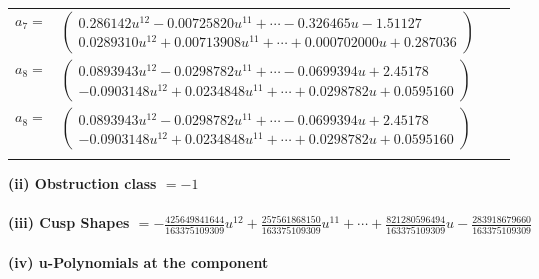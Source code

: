 \documentclass[1p]{elsarticle_modified}
\theoremstyle{definition}
\begin{document}
\begin{tabular}{m{7pt} m{180pt} m{7pt} m{180pt} }
\flushright $a_{7}=$&$\begin{pmatrix}0.286142 u^{12}-0.00725820 u^{11}+\cdots-0.326465 u-1.51127\\0.0289310 u^{12}+0.00713908 u^{11}+\cdots+0.000702000 u+0.287036\end{pmatrix}$ \\
\flushright $a_{8}=$&$\begin{pmatrix}0.0893943 u^{12}-0.0298782 u^{11}+\cdots-0.0699394 u+2.45178\\-0.0903148 u^{12}+0.0234848 u^{11}+\cdots+0.0298782 u+0.0595160\end{pmatrix}$\\ \flushright $a_{8}=$&$\begin{pmatrix}0.0893943 u^{12}-0.0298782 u^{11}+\cdots-0.0699394 u+2.45178\\-0.0903148 u^{12}+0.0234848 u^{11}+\cdots+0.0298782 u+0.0595160\end{pmatrix}$\\&\end{tabular}
\flushleft \textbf{(ii) Obstruction class $= -1$}\\~\\
\flushleft \textbf{(iii) Cusp Shapes $= -\frac{425649841644}{163375109309} u^{12}+\frac{257561868150}{163375109309} u^{11}+\cdots+\frac{821280596494}{163375109309} u-\frac{283918679660}{163375109309}$}\\~\\
\newpage\renewcommand{\arraystretch}{1}
\flushleft \textbf{(iv) u-Polynomials at the component}\newline \\
\end{document}
